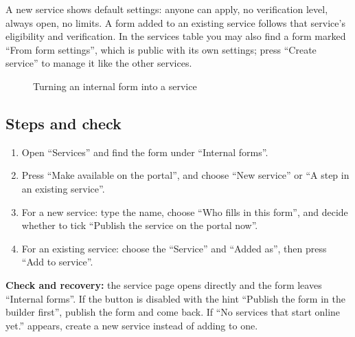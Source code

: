 A new service shows default settings: anyone can apply, no verification level, always open, no limits. A form added to an existing service follows that service's eligibility and verification. In the services table you may also find a form marked “From form settings”, which is public with its own settings; press “Create service” to manage it like the other services.

\begin{figure}[H]
\centering
{}
\rclegend
\caption{Turning an internal form into a service}
\label{fig:builder-services-publish-flow}
\end{figure}

\subsection{Steps and check}
\begin{enumerate}
\item Open “Services” and find the form under “Internal forms”.
\item Press “Make available on the portal”, and choose “New service” or “A step in an existing service”.
\item For a new service: type the name, choose “Who fills in this form”, and decide whether to tick “Publish the service on the portal now”.
\item For an existing service: choose the “Service” and “Added as”, then press “Add to service”.
\end{enumerate}

\textbf{Check and recovery:} the service page opens directly and the form leaves “Internal forms”. If the button is disabled with the hint “Publish the form in the builder first”, publish the form and come back. If “No services that start online yet.” appears, create a new service instead of adding to one.

